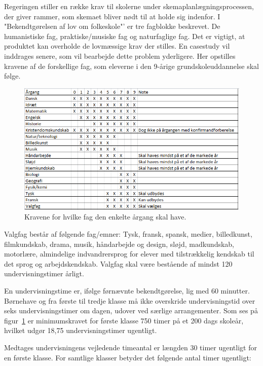 Regeringen stiller en række krav til skolerne under skemaplanlægningsprocessen, der giver rammer, som skemaet bliver nødt til at holde sig indenfor. I "Bekendtgørelsen af lov om folkeskole"' er tre fagblokke beskrevet. De humanistiske fag, praktiske/musiske fag og naturfaglige fag. Det er vigtigt, at produktet kan overholde de lovmæssige krav der stilles. En casestudy vil inddrages senere, som vil bearbejde dette problem yderligere. Her opstilles kravene af de forskellige fag, som eleverne i den 9-årige grundskoleuddannelse skal følge.

\begin{figure}[!hb]
  \centering
  \includegraphics[width=\textwidth]{partials/graphics/fagkrav.png}
  \caption{Kravene for hvilke fag den enkelte årgang skal have.}
  \label{fig:Time}
\end{figure}

Valgfag består af følgende fag/emner: Tysk, fransk, spansk, medier, billedkunst, filmkundskab, drama, musik, håndarbejde og design, sløjd, madkundskab, motorlære, almindelige indvandrersprog for elever med tilstrækkelig kendskab til det sprog og arbejdskendskab. Valgfag skal være bestående af mindst 120 undervisningstimer årligt.

En undervisningstime er, ifølge førnævnte bekendtgørelse, lig med 60 minutter. Børnehave og fra første til tredje klasse må ikke overskride undervisningstid over seks undervisningstimer om dagen, udover ved særlige arrangementer. Som ses på  figur~\ref{fig:Time} er minimumskravet for første klasse 750 timer på et 200 dags skoleår, hvilket udgør 18,75 undervisningstimer ugentligt.

Medtages undervisningens vejledende timeantal er længden 30 timer ugentligt for en første klasse. For samtlige klasser betyder det følgende antal timer ugentligt:


